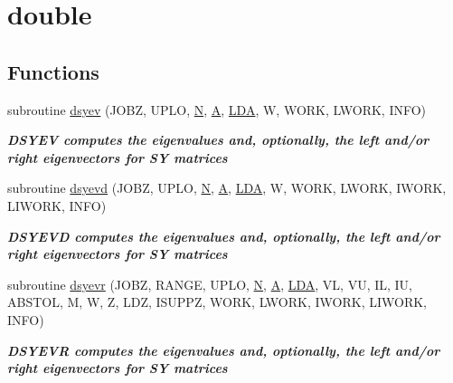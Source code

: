 \hypertarget{group__doubleSYeigen}{}\section{double}
\label{group__doubleSYeigen}
\subsection*{Functions}
\begin{DoxyCompactItemize}
\item 
subroutine \hyperlink{group__doubleSYeigen_ga442c43fca5493590f8f26cf42fed4044}{dsyev} (J\+O\+B\+Z, U\+P\+L\+O, \hyperlink{polmisc_8c_a0240ac851181b84ac374872dc5434ee4}{N}, \hyperlink{classA}{A}, \hyperlink{example__user_8c_ae946da542ce0db94dced19b2ecefd1aa}{L\+D\+A}, W, W\+O\+R\+K, L\+W\+O\+R\+K, I\+N\+F\+O)
\begin{DoxyCompactList}\small\item\em {\bfseries  D\+S\+Y\+E\+V computes the eigenvalues and, optionally, the left and/or right eigenvectors for S\+Y matrices} \end{DoxyCompactList}\item 
subroutine \hyperlink{group__doubleSYeigen_ga77dfa610458b6c9bd7db52533bfd53a1}{dsyevd} (J\+O\+B\+Z, U\+P\+L\+O, \hyperlink{polmisc_8c_a0240ac851181b84ac374872dc5434ee4}{N}, \hyperlink{classA}{A}, \hyperlink{example__user_8c_ae946da542ce0db94dced19b2ecefd1aa}{L\+D\+A}, W, W\+O\+R\+K, L\+W\+O\+R\+K, I\+W\+O\+R\+K, L\+I\+W\+O\+R\+K, I\+N\+F\+O)
\begin{DoxyCompactList}\small\item\em {\bfseries  D\+S\+Y\+E\+V\+D computes the eigenvalues and, optionally, the left and/or right eigenvectors for S\+Y matrices} \end{DoxyCompactList}\item 
subroutine \hyperlink{group__doubleSYeigen_gaeed8a131adf56eaa2a9e5b1e0cce5718}{dsyevr} (J\+O\+B\+Z, R\+A\+N\+G\+E, U\+P\+L\+O, \hyperlink{polmisc_8c_a0240ac851181b84ac374872dc5434ee4}{N}, \hyperlink{classA}{A}, \hyperlink{example__user_8c_ae946da542ce0db94dced19b2ecefd1aa}{L\+D\+A}, V\+L, V\+U, I\+L, I\+U, A\+B\+S\+T\+O\+L, M, W, Z, L\+D\+Z, I\+S\+U\+P\+P\+Z, W\+O\+R\+K, L\+W\+O\+R\+K, I\+W\+O\+R\+K, L\+I\+W\+O\+R\+K, I\+N\+F\+O)
\begin{DoxyCompactList}\small\item\em {\bfseries  D\+S\+Y\+E\+V\+R computes the eigenvalues and, optionally, the left and/or right eigenvectors for S\+Y matrices} \end{DoxyCompactList}\item 

\end{DoxyCompactItemize}
